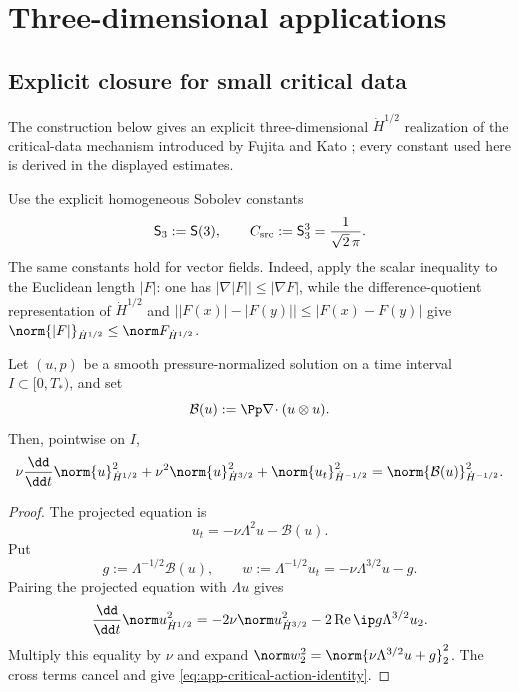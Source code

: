 \section{Three-dimensional applications}
\label{sec:three-dimensional-applications}

\subsection{Explicit closure for small critical data}

The construction below gives an explicit three-dimensional
\(\dot H^{1/2}\) realization of the critical-data mechanism introduced by
Fujita and Kato \cite{FujitaKato1964}; every constant used here is derived
in the displayed estimates.

Use the explicit homogeneous Sobolev constants
\[
 \mathsf S_3:=\mathsf S(3),
 \qquad
 C_{\rm src}:=\mathsf S_3^3=\frac1{\sqrt2\,\pi}.
\]
The same constants hold for vector fields.  Indeed, apply the scalar
inequality to the Euclidean length \(|F|\): one has
\(|\nabla|F||\le|\nabla F|\), while the difference-quotient representation of
\(\dot H^{1/2}\) and
\(\bigl||F(x)|-|F(y)|\bigr|\le|F(x)-F(y)|\) give
\(\norm{|F|}_{\dot H^{1/2}}\le\norm F_{\dot H^{1/2}}\).

\begin{lemma}
\label{lem:app-critical-action-identity}
Let \((u,p)\) be a smooth pressure-normalized solution on a time interval
\(I\subset[0,T_*)\), and set
\[
 \mathcal B(u):=\Pp\nabla\!\cdot(u\otimes u).
\]
Then, pointwise on \(I\),
\begin{equation}
 \nu\frac{\dd}{\dd t}\norm{u}_{\dot H^{1/2}}^2
 +\nu^2\norm{u}_{\dot H^{3/2}}^2
 +\norm{u_t}_{\dot H^{-1/2}}^2
 =\norm{\mathcal B(u)}_{\dot H^{-1/2}}^2.
 \label{eq:app-critical-action-identity}
\end{equation}
\end{lemma}

\begin{proof}
The projected equation is
\[
 u_t=-\nu\Lambda^2u-\mathcal B(u).
\]
Put
\[
 g:=\Lambda^{-1/2}\mathcal B(u),
 \qquad
 w:=\Lambda^{-1/2}u_t=-\nu\Lambda^{3/2}u-g.
\]
Pairing the projected equation with \(\Lambda u\) gives
\[
 \frac{\dd}{\dd t}\norm u_{\dot H^{1/2}}^2
 =-2\nu\norm u_{\dot H^{3/2}}^2
  -2\operatorname{Re}\ip g{\Lambda^{3/2}u}_2.
\]
Multiply this equality by \(\nu\) and expand
\(\norm w_2^2=\norm{\nu\Lambda^{3/2}u+g}_2^2\).
The cross terms cancel and give
\eqref{eq:app-critical-action-identity}.
\end{proof}

